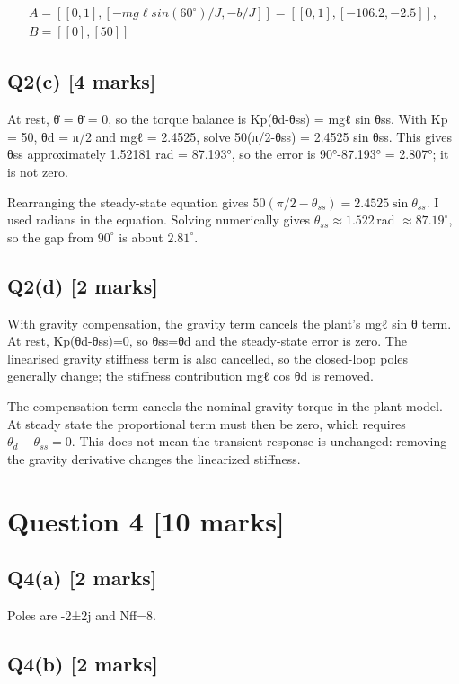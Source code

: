 \documentclass[11pt,a4paper]{article}
\begin{document}
\[\begin{aligned}A = [[0,1], [-mg\ell sin(60^{\circ})/J, -b/J]] = [[0,1], [-106.2, -2.5]],\\ B = [[0],[50]]\end{aligned}\]

\subsection*{Q2(c) \hfill [4 marks]}

At rest, θ̇ = θ̈ = 0, so the torque balance is Kp(θd-θss) = mgℓ sin θss.
With Kp = 50, θd = π/2 and mgℓ = 2.4525, solve 50(π/2-θss) = 2.4525 sin θss.
This gives θss approximately 1.52181 rad = 87.193°, so the error is 90°-87.193° = 2.807°; it is not zero.\par\smallskip Rearranging the steady-state equation gives $50(\pi/2-\theta_{ss})=2.4525\sin\theta_{ss}$. I used radians in the equation. Solving numerically gives $\theta_{ss}\approx1.522\,$rad $\approx87.19^\circ$, so the gap from $90^\circ$ is about $2.81^\circ$.

\subsection*{Q2(d) \hfill [2 marks]}

With gravity compensation, the gravity term cancels the plant's mgℓ sin θ term.
At rest, Kp(θd-θss)=0, so θss=θd and the steady-state error is zero.
The linearised gravity stiffness term is also cancelled, so the closed-loop poles generally change; the stiffness contribution mgℓ cos θd is removed.\par\smallskip The compensation term cancels the nominal gravity torque in the plant model. At steady state the proportional term must then be zero, which requires $\theta_d-\theta_{ss}=0$. This does not mean the transient response is unchanged: removing the gravity derivative changes the linearized stiffness.

\section*{Question 4 \hfill [10 marks]}
\subsection*{Q4(a) \hfill [2 marks]}

Poles are -2±2j and Nff=8.

\subsection*{Q4(b) \hfill [2 marks]}
\end{document}
